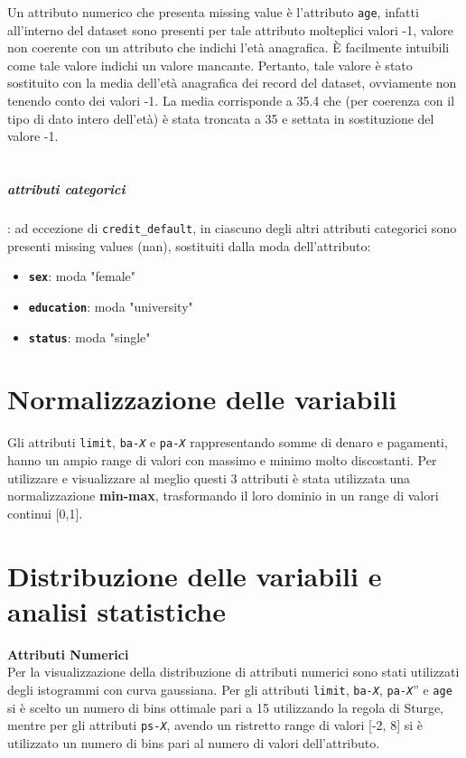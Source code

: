 Un attributo numerico che presenta missing value \`e l'attributo \texttt{age}, infatti all'interno del dataset sono presenti per tale attributo molteplici valori -1, valore non coerente con un attributo che indichi l'et\`a anagrafica. \`E facilmente intuibili come tale valore indichi un valore mancante. Pertanto, tale valore \`e stato sostituito con la media dell'et\`a anagrafica dei record del dataset, ovviamente non tenendo conto dei valori -1. La media corrisponde a 35.4 che (per coerenza con il tipo di dato intero dell'et\`a) \`e stata troncata a 35 e settata in sostituzione del valore -1.\\\\
\subparagraph{attributi categorici}: ad eccezione di \texttt{credit\_default}, in ciascuno degli altri attributi categorici sono presenti missing values (nan), sostituiti dalla moda dell'attributo:
\begin{itemize}
\item \textbf{\texttt{sex}}: moda "female"
\item \textbf{\texttt{education}}: moda "university"
\item \textbf{\texttt{status}}: moda "single"
\end{itemize}

\section{Normalizzazione delle variabili}
Gli attributi \texttt{limit}, \texttt{ba-\textit{X}} e \texttt{pa-\textit{X}} rappresentando somme di denaro e pagamenti, hanno un ampio range di valori con massimo e minimo molto discostanti. Per utilizzare e visualizzare al meglio questi 3 attributi \`e stata utilizzata una normalizzazione \textbf{min-max}, trasformando il loro dominio in un range di valori continui [0,1].

\section{Distribuzione delle variabili e analisi statistiche}
\textbf{Attributi Numerici}\\
Per la visualizzazione della distribuzione di attributi numerici sono stati utilizzati degli istogrammi con curva gaussiana. Per gli attributi \texttt{limit},  \texttt{ba-\textit{X}}, \texttt{pa-\textit{X}}” e \texttt{age} si \`e scelto un numero di bins ottimale pari a 15 utilizzando la regola di Sturge, mentre per gli attributi  \texttt{ps-\textit{X}}, avendo un ristretto range di valori [-2, 8] si \`e utilizzato un numero di bins pari al numero di valori dell'attributo.

